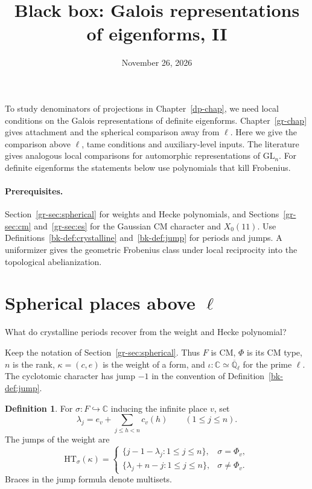 \documentclass[reqno]{amsart}
\title{Black box: Galois representations of eigenforms, II}
\author{}
\date{November 26, 2026}
\newcounter{chap}
\theoremstyle{definition}
\newtheorem{definition}{Definition}[section]
\newcommand{\Q}{\mathbb Q}
\newcommand{\C}{\mathbb C}
\newcommand{\Qlbar}{\overline{\Q}_\ell}
\newcommand{\GL}{\mathrm{GL}}
\newcommand{\HT}{\mathrm{HT}}
\begin{document}
\maketitle
{}\label{chap}

To study denominators of projections in Chapter~\ref{dp-chap}, we need local conditions on the Galois representations of definite eigenforms.  Chapter~\ref{gr-chap} gives attachment and the spherical comparison away from \(\ell\).  Here we give the comparison above \(\ell\), tame conditions and auxiliary-level inputs.  The literature gives analogous local comparisons for automorphic representations of \(\GL_n\).  For definite eigenforms the statements below use polynomials that kill Frobenius.

\paragraph{Prerequisites.}
Section~\ref{gr-sec:spherical} for weights and Hecke polynomials, and Sections~\ref{gr-sec:cm} and~\ref{gr-sec:es} for the Gaussian CM character and \(X_0(11)\).  Use Definitions~\ref{bk-def:crystalline} and~\ref{bk-def:jump} for periods and jumps.  A uniformizer gives the geometric Frobenius class under local reciprocity into the topological abelianization.

\section{Spherical places above \texorpdfstring{\(\ell\)}{ell}}\label{sec:local}

What do crystalline periods recover from the weight and Hecke polynomial?

Keep the notation of Section~\ref{gr-sec:spherical}.  Thus \(F\) is CM, \(\Phi\) is its CM type, \(n\) is the rank, \(\kappa=(c,e)\) is the weight of a form, and \(\iota:\C\simeq\Qlbar\) for the prime \(\ell\).  The cyclotomic character has jump \(-1\) in the convention of Definition~\ref{bk-def:jump}.

\begin{definition}\label{def:jumps-of-weight}
For \(\sigma:F\hookrightarrow\C\) inducing the infinite place \(v\), set
\[
 \lambda_j=e_v+\sum_{j\le h<n}c_v(h)\qquad(1\le j\le n).
\]
The jumps of the weight are
\[
 \HT_\sigma(\kappa)=
 \begin{cases}
 \{j-1-\lambda_j:1\le j\le n\},&\sigma=\Phi_v,\\
 \{\lambda_j+n-j:1\le j\le n\},&\sigma\ne\Phi_v .
 \end{cases}
\]
Braces in the jump formula denote multisets.
\end{definition}
\end{document}
